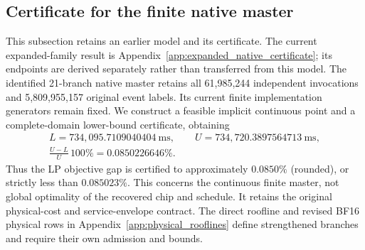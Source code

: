 \subsection{Certificate for the finite native master}
\label{app:native_lp_certificate}
This subsection retains an earlier model and its certificate. The current
expanded-family result is Appendix~\ref{app:expanded_native_certificate};
its endpoints are derived separately rather than transferred from this model.
The identified 21-branch native master retains all 61,985,244 independent
invocations and 5,809,955,157 original event labels. Its current finite
implementation generators remain fixed. We construct a feasible implicit
continuous point and a complete-domain lower-bound certificate, obtaining
\[
 \begin{gathered}
 L=734{,}095.7109040404\ \mathrm{ms},\qquad
 U=734{,}720.3897564713\ \mathrm{ms},\\
 \frac{U-L}{U}\,100\%=0.0850226646\%.
 \end{gathered}
\]
Thus the LP objective gap is certified to approximately $0.0850\%$
(rounded), or strictly less than $0.085023\%$. This concerns the continuous
finite master, not global optimality of the recovered chip and schedule.
It retains the original physical-cost and service-envelope contract. The direct
roofline and revised BF16 physical rows in Appendix~\ref{app:physical_rooflines}
define strengthened branches and require their own admission and bounds.

